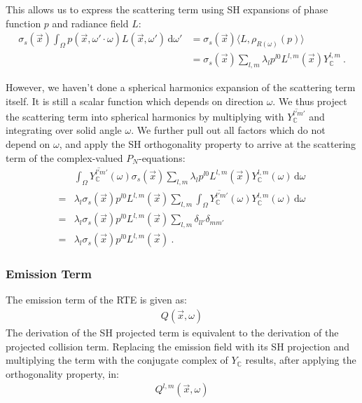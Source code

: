 \documentclass{egpubl}
\newcommand{\ud}{\,\mathrm{d}} %
\newcommand{\SHBC}{Y_{\mathbb{C}}} %
\begin{document}
This allows us to express the scattering term using SH expansions of phase function $p$ and radiance field $L$:
\begin{align*}
\sigma_s(\vec{x})\int_{\Omega}p(\vec{x}, \omega'\cdot\omega)L(\vec{x}, \omega')\ud\omega'
&=
\sigma_s(\vec{x})\langle L,  \rho_{R(\omega)}(p)\rangle
\\
&=
\sigma_s(\vec{x})
\sum_{l,m}
{
\lambda_l
p^{l0}L^{l,m}(\vec{x})
\SHBC^{l,m}
} \ .
\end{align*}

However, we haven't done a spherical harmonics expansion of the scattering term itself. It is still a scalar function which depends on direction $\omega$. We thus project the scattering term into spherical harmonics by multiplying with $\overline {\SHBC^{l'm'}}$ and integrating over solid angle $\omega$. We further pull out all factors which do not depend on $\omega$, and apply the SH orthogonality property to arrive at the scattering term of the complex-valued $P_N$-equations:
\begin{align}
&
\int_{\Omega}
{
\overline{\SHBC^{l'm'}}(\omega)
\sigma_s(\vec{x})
\sum_{l,m}
{
\lambda_l
p^{l0}L^{l,m}(\vec{x})
\SHBC^{l,m}\left(\omega\right)
}
\ud\omega
}
\nonumber\\
=&
\lambda_l
\sigma_s(\vec{x})
p^{l0}L^{l,m}(\vec{x})
\sum_{l,m}
{
\int_{\Omega}
{
\overline{\SHBC^{l'm'}}(\omega)
\SHBC^{l,m}\left(\omega\right)
\ud\omega
}
}
\nonumber\\
=&
\lambda_l
\sigma_s(\vec{x})
p^{l0}L^{l,m}(\vec{x})
\sum_{l,m}
{
\delta_{ll'}\delta_{mm'}
}
\nonumber\\
=&
\lambda_l
\sigma_s(\vec{x})
p^{l0}L^{l,m}(\vec{x}) \ .
\end{align}

\subsubsection{Emission Term}

The emission term of the RTE is given as:
\begin{align}
Q\left(\vec{x}, \omega\right)
\end{align}
The derivation of the SH projected term is equivalent to the derivation of the projected collision term. Replacing the emission field with its SH projection and multiplying the term with the conjugate complex of $\SHBC$ results, after applying the orthogonality property, in:
\begin{align}
Q^{l,m}\left(\vec{x}, \omega\right)
\end{align}
\end{document}
